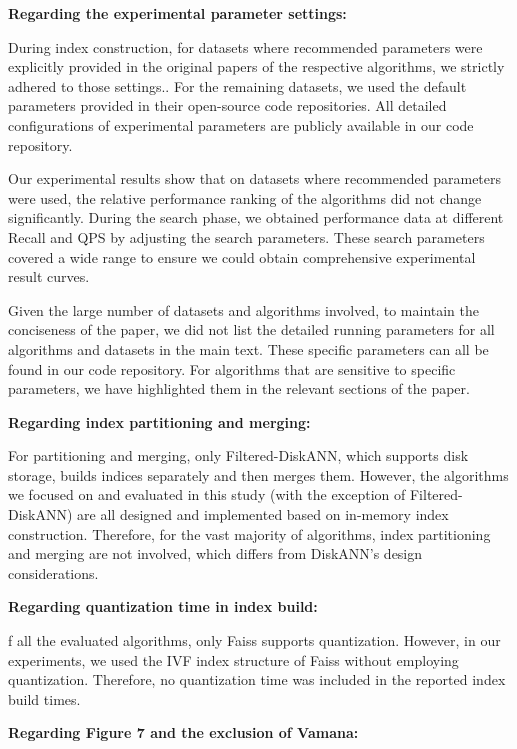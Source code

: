 \documentclass[sigconf, nonacm]{acmart}
\newcounter{detailed}[section]
\begin{document}
\textbf{Regarding the experimental parameter settings:}

During index construction, for datasets where recommended parameters were explicitly provided in the original papers of the respective algorithms, we strictly adhered to those settings.. For the remaining datasets, we used the default parameters provided in their open-source code repositories. All detailed configurations of experimental parameters are publicly available in our code repository.

 Our experimental results show that on datasets where recommended parameters were used, the relative performance ranking of the algorithms did not change significantly.
During the search phase, we obtained performance data at different Recall and QPS by adjusting the search parameters. These search parameters covered a wide range to ensure we could obtain comprehensive experimental result curves.

 Given the large number of datasets and algorithms involved, to maintain the conciseness of the paper, we did not list the detailed running parameters for all algorithms and datasets in the main text. These specific parameters can all be found in our code repository. For algorithms that are sensitive to specific parameters, we have highlighted them in the relevant sections of the paper.
 
\textbf{Regarding index partitioning and merging:}

For partitioning and merging, only Filtered-DiskANN, which supports disk storage, builds indices separately and then merges them. However, the algorithms we focused on and evaluated in this study (with the exception of Filtered-DiskANN) are all designed and implemented based on in-memory index construction. Therefore, for the vast majority of algorithms, index partitioning and merging are not involved, which differs from DiskANN's design considerations.

\textbf{Regarding quantization time in index build:}

f all the evaluated algorithms, only Faiss supports quantization. However, in our experiments, we used the IVF index structure of Faiss without employing quantization. Therefore, no quantization time was included in the reported index build times.

\textbf{Regarding Figure 7 and the exclusion of Vamana:}
\end{document}
